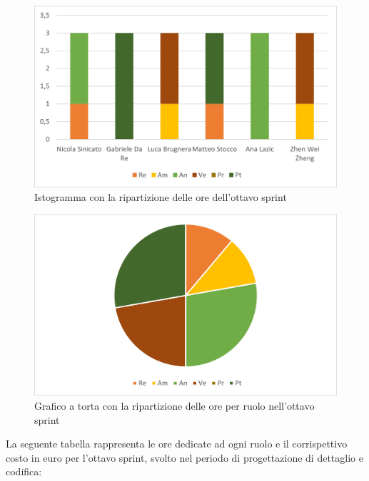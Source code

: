 \begin{figure}[H]
    \centering
    \includegraphics[scale=0.6]{img/grafi preventivo/istogrammi/codifica/periodo1.png}
    \caption{Istogramma con la ripartizione delle ore dell'ottavo sprint}
\end{figure}
\begin{figure}[H]
    \centering
    \includegraphics[scale=0.6]{img/grafi preventivo/torta/codifica/periodo1.png}
    \caption{Grafico a torta con la ripartizione delle ore per ruolo nell'ottavo sprint}
\end{figure}
La seguente tabella rappresenta le ore dedicate ad ogni ruolo e il corrispettivo costo in euro per l'ottavo sprint, svolto nel periodo di progettazione di dettaglio e codifica: 


